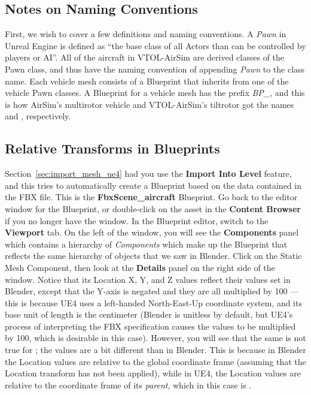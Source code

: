 \subsection{Notes on Naming Conventions}
First, we wish to cover a few definitions and naming conventions. A \textit{Pawn} in Unreal Engine is defined as ``the base class of all Actors than can be controlled by players or AI''. All of the aircraft in VTOL-AirSim are derived classes of the Pawn \CC class, and thus have the naming convention of appending \textit{Pawn} to the class name. Each vehicle mesh consists of a Blueprint that inherits from one of the vehicle Pawn \CC classes. A Blueprint for a vehicle mesh has the prefix \textit{BP\_}, and this is how AirSim's multirotor vehicle and VTOL-AirSim's tiltrotor got the names  and , respectively.

\subsection{Relative Transforms in Blueprints}
Section~\ref{sec:import_mesh_ue4} had you use the \textbf{Import Into Level} feature, and this tries to automatically create a Blueprint based on the data contained in the FBX file. This is the \textbf{FbxScene\_aircraft} Blueprint. Go back to the editor window for the Blueprint, or double-click on the asset in the \textbf{Content Browser} if you no longer have the window. In the Blueprint editor, switch to the \textbf{Viewport} tab. On the left of the window, you will see the \textbf{Components} panel which contains a hierarchy of \textit{Components} which make up the Blueprint that reflects the same hierarchy of objects that we saw in Blender. Click on the  Static Mesh Component, then look at the \textbf{Details} panel on the right side of the window. Notice that its Location X, Y, and Z values reflect their values set in Blender, except that the Y-axis is negated and they are all multiplied by 100 --- this is because UE4 uses a left-handed North-East-Up coordinate system, and its base unit of length is the centimeter (Blender is unitless by default, but UE4's process of interpreting the FBX specification causes the values to be multiplied by 100, which is desirable in this case). However, you will see that the same is not true for ; the values are a bit different than in Blender. This is because in Blender the Location values are relative to the global coordinate frame (assuming that the Location transform has not been applied), while in UE4, the Location values are relative to the coordinate frame of its \textit{parent}, which in this case is .

